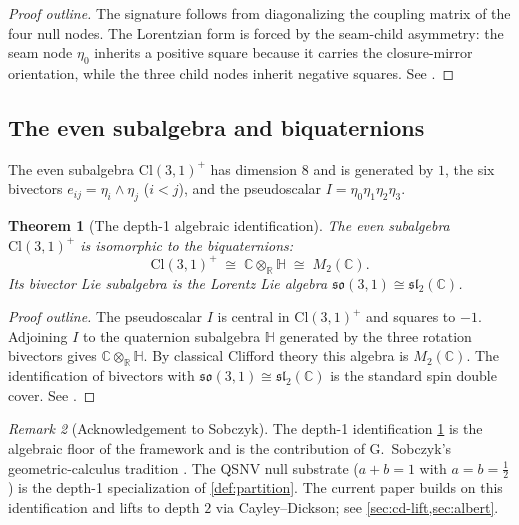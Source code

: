 \documentclass[11pt,a4paper]{article}
\theoremstyle{plain}
\newtheorem{theorem}{Theorem}[section]
\theoremstyle{definition}
\theoremstyle{remark}
\newtheorem{remark}[theorem]{Remark}
\numberwithin{equation}{section}
\providecommand{\Cl}{\mathrm{Cl}}
\providecommand{\R}{\mathbb{R}}
\providecommand{\C}{\mathbb{C}}
\providecommand{\HH}{\mathbb{H}}
\providecommand{\half}{\tfrac{1}{2}}
\providecommand{\slgo}{\mathfrak{sl}}
\providecommand{\sogo}{\mathfrak{so}}
\providecommand{\eb}[1]{e_{#1}}
\begin{document}
\begin{proof}[Proof outline]
The signature follows from diagonalizing the coupling matrix of
the four null nodes.  The Lorentzian form is forced by the
seam-child asymmetry: the seam node $\eta_0$ inherits a positive
square because it carries the closure-mirror orientation, while
the three child nodes inherit negative squares.  See
\cite[Prop.~3.2]{golden-tetrad}.
\end{proof}

\subsection{The even subalgebra and biquaternions}

The even subalgebra $\Cl(3,1)^+$ has dimension $8$ and is generated
by $1$, the six bivectors $\eb{ij} = \eta_i \wedge \eta_j$
($i < j$), and the pseudoscalar $I = \eta_0 \eta_1 \eta_2 \eta_3$.

\begin{theorem}[The depth-1 algebraic identification]
\label{thm:biquaternion}
The even subalgebra $\Cl(3,1)^+$ is isomorphic to the biquaternions:
\[
  \Cl(3,1)^+ \;\cong\; \C \otimes_\R \HH \;\cong\; M_2(\C).
\]
Its bivector Lie subalgebra is the Lorentz Lie algebra
$\sogo(3,1) \cong \slgo_2(\C)$.
\end{theorem}

\begin{proof}[Proof outline]
The pseudoscalar $I$ is central in $\Cl(3,1)^+$ and squares to
$-1$.  Adjoining $I$ to the quaternion subalgebra $\HH$ generated
by the three rotation bivectors gives $\C \otimes_\R \HH$.  By
classical Clifford theory this algebra is $M_2(\C)$.  The
identification of bivectors with $\sogo(3,1)\cong\slgo_2(\C)$ is
the standard spin double cover.  See
\cite[\S2]{single-symmetry}.
\end{proof}

\begin{remark}[Acknowledgement to Sobczyk]
\label{rmk:sobczyk}
The depth-1 identification \cref{thm:biquaternion} is the
algebraic floor of the framework and is the contribution of
G.~Sobczyk's geometric-calculus tradition
\cite{hestenes-sobczyk,sobczyk-qsnv}.  The QSNV null substrate
($a + b = 1$ with $a = b = \half$) is the depth-1 specialization
of \cref{def:partition}.  The current paper builds on this
identification and lifts to depth $2$ via Cayley--Dickson; see
\cref{sec:cd-lift,sec:albert}.
\end{remark}
\end{document}

